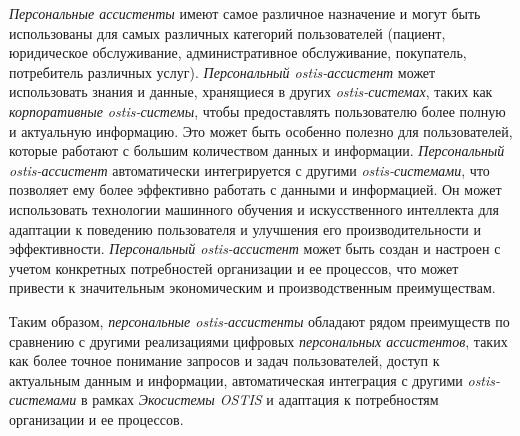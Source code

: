 \textit{Персональные ассистенты} имеют самое различное назначение и могут быть использованы для самых различных категорий пользователей (пациент, юридическое обслуживание, административное обслуживание, покупатель, потребитель различных услуг). \textit{Персональный ostis-ассистент} может использовать знания и данные, хранящиеся в других \textit{ostis-системах}, таких как \textit{корпоративные ostis-системы}, чтобы предоставлять пользователю более полную и актуальную информацию. Это может быть особенно полезно для пользователей, которые работают с большим количеством данных и информации. \textit{Персональный ostis-ассистент} автоматически интегрируется с другими \textit{ostis-системами}, что позволяет ему более эффективно работать с данными и информацией. Он может использовать технологии машинного обучения и искусственного интеллекта для адаптации к поведению пользователя и улучшения его производительности и эффективности. \textit{Персональный ostis-ассистент} может быть создан и настроен с учетом конкретных потребностей организации и ее процессов, что может привести к значительным экономическим и производственным преимуществам.

Таким образом, \textit{персональные ostis-ассистенты} обладают рядом преимуществ по сравнению с другими реализациями цифровых \textit{персональных ассистентов}, таких как более точное понимание запросов и задач пользователей, доступ к актуальным данным и информации, автоматическая интеграция с другими \textit{ostis-системами} в рамках \textit{Экосистемы OSTIS} и адаптация к потребностям организации и ее процессов.
